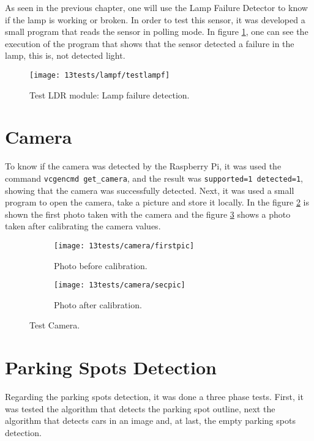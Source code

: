 As seen in the previous chapter, one will use the Lamp Failure Detector to know if the lamp is working or broken. In order to test this sensor, it was developed a small program that reads the sensor in polling mode. In figure \ref{fig:testlampf}, one can see the execution of the program that shows that the sensor detected a failure in the lamp, this is, not detected light.

\begin{figure}[H]
	\centering	
	\texttt{[image: 13tests/lampf/testlampf]}
	\caption{Test LDR module: Lamp failure detection.}
	\label{fig:testlampf}
\end{figure}

\section{Camera}

To know if the camera was detected by the Raspberry Pi, it was used the command \verb|vcgencmd get_camera|, and the result was \verb|supported=1 detected=1|, showing that the camera was successfully detected. Next, it was used a small program to open the camera, take a picture and store it locally. In the figure \ref{fig:firstpic} is shown the first photo taken with the camera and the figure \ref{fig:secpic} shows a photo taken after calibrating the camera values.

\begin{figure}[H]
	\centering
	\begin{subfigure}{.4\textwidth}
		\centering
		\texttt{[image: 13tests/camera/firstpic]}
		\caption{Photo before calibration.}
		\label{fig:firstpic}
	\end{subfigure}%
	\begin{subfigure}{.4\textwidth}
		\centering
		\texttt{[image: 13tests/camera/secpic]}
		\caption{Photo after calibration.}
		\label{fig:secpic}
	\end{subfigure}
	\caption{Test Camera.}
	\label{fig:pics}
\end{figure}

\section{Parking Spots Detection}

Regarding the parking spots detection, it was done a three phase tests. First, it was tested the algorithm that detects the parking spot outline, next the algorithm that detects cars in an image and, at last, the empty parking spots detection.


